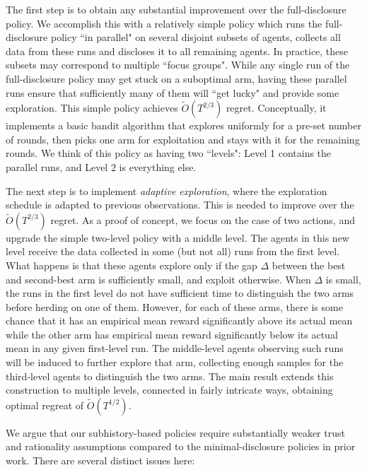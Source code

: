 The first step is to obtain any substantial improvement over the full-disclosure policy. We accomplish this with a relatively simple policy which runs the full-disclosure policy ``in parallel" on several disjoint subsets of agents,  collects all data from these runs and discloses it to all remaining agents. In practice, these subsets may correspond to multiple ``focus groups". While any single run of the full-disclosure policy may get stuck on a suboptimal arm, having these parallel runs ensure that sufficiently many of them will ``get lucky" and provide some exploration. This simple policy achieves $\tilde{O}(T^{2/3})$ regret. Conceptually, it implements a basic bandit algorithm that explores uniformly for a pre-set number of rounds, then picks one arm for exploitation and stays with it for the remaining rounds. We think of this policy  as having two ``levels": Level 1 contains the parallel runs, and Level 2 is everything else.

The next step is to implement \emph{adaptive exploration}, where the exploration schedule is adapted to previous observations. This is needed to improve over the $\tilde{O}(T^{2/3})$ regret. As a proof of concept, we focus on the case of two actions, and upgrade the simple two-level policy with a middle level. The agents in this new level receive the data collected in some (but not all) runs from the first level. What happens is that these agents explore only if the gap $\Delta$ between the best and second-best arm is sufficiently small, and exploit otherwise. When $\Delta$ is small, the runs in the first level do not have sufficient time to distinguish the two arms before herding on one of them.  However, for each of these arms, there is some chance that it has an empirical mean reward significantly above its actual mean while the other arm has empirical mean reward significantly below its actual mean in any given first-level run.  The middle-level agents observing such runs will be induced to further explore that arm, collecting enough samples for the third-level agents to distinguish the two arms. The main result extends this construction to multiple levels, connected in fairly intricate ways, obtaining optimal regreat of $\tilde{O}(T^{1/2})$.



We argue that our subhistory-based policies require substantially weaker trust and rationality assumptions compared to the minimal-disclosure policies in prior work. There are several distinct issues here: 

